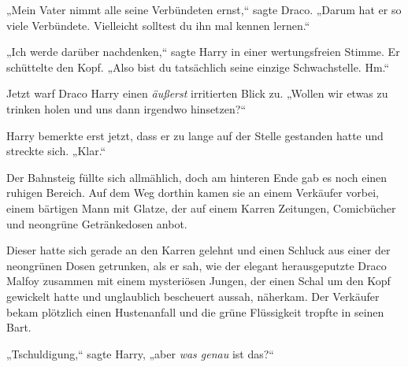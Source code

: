„Mein Vater nimmt alle seine Verbündeten ernst,“ sagte Draco. „Darum hat er so viele Verbündete. Vielleicht solltest du ihn mal kennen lernen.“

„Ich werde darüber nachdenken,“ sagte Harry in einer wertungsfreien Stimme. Er schüttelte den Kopf. „Also bist du tatsächlich seine einzige Schwachstelle. Hm.“

Jetzt warf Draco Harry einen \emph{äußerst} irritierten Blick zu. „Wollen wir etwas zu trinken holen und uns dann irgendwo hinsetzen?“

Harry bemerkte erst jetzt, dass er zu lange auf der Stelle gestanden hatte und streckte sich. „Klar.“

Der Bahnsteig füllte sich allmählich, doch am hinteren Ende gab es noch einen ruhigen Bereich. Auf dem Weg dorthin kamen sie an einem Verkäufer vorbei, einem bärtigen Mann mit Glatze, der auf einem Karren Zeitungen, Comicbücher und neongrüne Getränkedosen anbot.

Dieser hatte sich gerade an den Karren gelehnt und einen Schluck aus einer der neongrünen Dosen getrunken, als er sah, wie der elegant herausgeputzte Draco Malfoy zusammen mit einem mysteriösen Jungen, der einen Schal um den Kopf gewickelt hatte und unglaublich bescheuert aussah, näherkam. Der Verkäufer bekam plötzlich einen Hustenanfall und die grüne Flüssigkeit tropfte in seinen Bart.

„Tschuldigung,“ sagte Harry, „aber \emph{was genau} ist das?“

